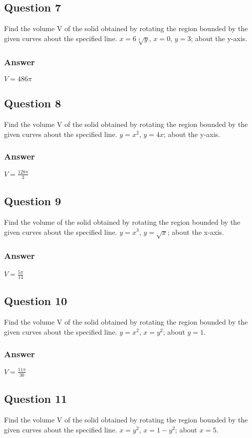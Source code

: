 \documentclass{article}
\begin{document}
\subsection*{Question 7}
Find the volume V of the solid obtained by rotating the region bounded by the given curves about the specified line. $x=6\sqrt[3]{y}$, $x=0$, $y=3$; about the y-axis.
\subsubsection*{Answer}
$ V = 486\pi $

\subsection*{Question 8}
Find the volume V of the solid obtained by rotating the region bounded by the given curves about the specified line. $y=x^2$, $y=4x$; about the y-axis.
\subsubsection*{Answer}
$ V = \frac{128\pi}{3} $

\subsection*{Question 9}
Find the volume of the solid obtained by rotating the region bounded by the given curves about the specified line. $y=x^3$, $y=\sqrt{x}$; about the x-axis.
\subsubsection*{Answer}
$ V = \frac{5\pi}{14} $

\subsection*{Question 10}
Find the volume V of the solid obtained by rotating the region bounded by the given curves about the specified line. $y=x^2$, $x=y^2$; about $y=1$.
\subsubsection*{Answer}
$ V = \frac{11\pi}{30} $

\subsection*{Question 11}
Find the volume V of the solid obtained by rotating the region bounded by the given curves about the specified line. $x=y^2$, $x=1-y^2$; about $x=5$.
\end{document}
